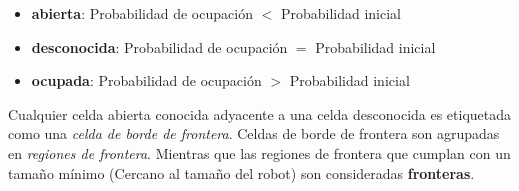 \documentclass[12pt]{article}
\begin{document}
\begin{itemize}
	\item \textbf{abierta}: Probabilidad de ocupación $<$ Probabilidad inicial
	\item \textbf{desconocida}: Probabilidad de ocupación $=$ Probabilidad inicial
	\item \textbf{ocupada}: Probabilidad de ocupación $>$ Probabilidad inicial
\end{itemize}

Cualquier celda abierta conocida adyacente a una celda desconocida es etiquetada como una \emph{celda de borde de frontera}. Celdas de borde de frontera son agrupadas en \emph{regiones de frontera}. Mientras que las regiones de frontera que cumplan con un tamaño mínimo (Cercano al tamaño del robot) son consideradas \textbf{fronteras}.

%
%
\end{document}
